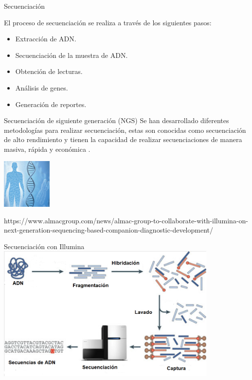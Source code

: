\documentclass[xcolor=dvipsnames]{beamer}
\begin{document}
\begin{frame}{Secuenciación}
	
	El proceso de secuenciación se realiza a través de los siguientes pasos:
	
	\begin{itemize}
		\item Extracción de ADN.
		\item Secuenciación de la muestra de ADN.
		\item Obtención de lecturas.
		\item Análisis de genes.
		\item Generación de reportes.
	\end{itemize}
	
\end{frame}

\begin{frame}{Secuenciación de siguiente generación (NGS)}	
	\justifying
	Se han desarrollado diferentes metodologías para realizar secuenciación, estas son conocidas como secuenciación de alto rendimiento y tienen la capacidad de realizar secuenciaciones de manera masiva, rápida y económica  \cite{Kulski2016}. 
	
\hfill \break
	\centering
\includegraphics[width=25mm]{ngs.jpg}

\hfill \break

\justifying
\tiny{https://www.almacgroup.com/news/almac-group-to-collaborate-with-illumina-on-next-generation-sequencing-based-companion-diagnostic-development/}
	
\end{frame}

\begin{frame}{Secuenciación con Illumina}
	\centering
	\includegraphics[width=11cm]{secuenciacion1.png}
\end{frame}
\end{document}
